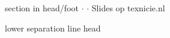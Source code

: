 {\begin{beamercolorbox}{section in head/foot}
{            \hspace{5pt}$ \cdot $\hspace{5pt}%
            \hyperlink{adjustbox}{}%
            \hspace{5pt}$ \cdot $\hspace{5pt}%
            \hyperlink{opUitstap}{}%
        }%
        \hfil
        Slides op texnicie.nl
        \hfil
        \vskip4pt
    \end{beamercolorbox}%
    \begin{beamercolorbox}[colsep=1.5pt]{lower separation line head}%
    \end{beamercolorbox}%
}
